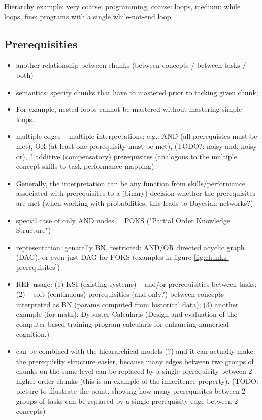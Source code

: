 Hierarchy example:
very coarse: programming,
coarse: loops,
medium: while loops,
fine: programs with a single while-not-end loop.



\subsection{Prerequisities}

\begin{itemize}
\item another relationship between chunks (between concepts / between tasks / both)
\item semantics: specify chunks that have to mastered prior to tacking given chunk;
\item For example, nested loops cannot be mastered without mastering simple loops.
\item multiple edges -- multiple interpretations: e.g.:
  AND (all prerequistes must be met),
  OR (at least one prerequisity must be met),
  (TODO?: noisy and, noisy or),
  ? additive (compensatory) prerequisites
  (analogous to the multiple concept skills to task performance mapping).
\item Generally, the interpretation can be any function from skills/performance
  associated with prerequisites to a (binary) decision whether the prerequisites are met
  (when working with probabilities, this leads to Bayesian networks?)
\item special case of only AND nodes = POKS ("Partial Order Knowledge Structure")
\item representation: genarally BN, restricted: AND/OR directed acyclic graph (DAG),
  or even just DAG for POKS (examples in figure \ref{fig:chunks-prerequisites})
\item REF usage:
  (1) KSI (existing systems) -- and/or prerequisities between tasks;
  (2) \cite{its-programming} -- soft (continuous) prerequisities (and only?)
    between concepts interpreted as BN (params computed from historical data);
  (3) another example (for math): Dybuster Calcularis (Design and evaluation of the computer-based training program calcularis for enhancing numerical cognition.)
\item can be combined with the hieararchical models
  (?) and it can actually make the prerequisity structure easier, because
    many edges between two groups of chunks on the same level
    can be replaced by a single prerequisity between 2 higher-order chunks
    (this is an example of the inheritence property).
  (TODO: picture to illustrate the point, showing how many prerequisites between
    2 groups of tasks can be replaced by a single prerequisity edge between 2 concepts)
\end{itemize}


